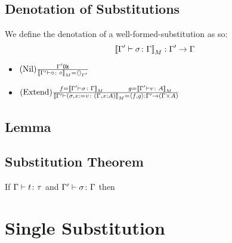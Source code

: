 {    \subsection{Denotation of Substitutions}
    We define the denotation of a well-formed-substitution as so:
    \begin{equation}
        {\bf [\![}\Gamma' \vdash \sigma \colon \Gamma{\bf ]\!]}_M: \Gamma' \rightarrow \Gamma
    \end{equation}
    \begin{itemize}
        \item $(\text{Nil}) \frac{\Gamma' \texttt{Ok}}{{\bf [\![}\Gamma' \vdash \diamond \colon \diamond{\bf ]\!]}_M = \left\langle\right\rangle_{\Gamma'}}$
        \item $\treerule{Extend}{f = \deno{\typerelation{\G'}{\si}{\G}}\s\s g= \deno{\typerelation{\G'}{v}{A}}}{\deno{\typerelation{\G'}{(\si, x\setto v}{(\gax)}} = \pr{f}{g}:\G' \rightarrow (\G\times A)}$
    \end{itemize}
    \subsection{Lemma}
    \subsection{Substitution Theorem}

    If $\Gamma \vdash t \colon \tau$ and $\Gamma' \vdash \sigma \colon \Gamma$ then
    \section{Single Substitution}
}



\ifdefined\NoDocument
\else
\documentclass{report}


    \Substitution

\fi